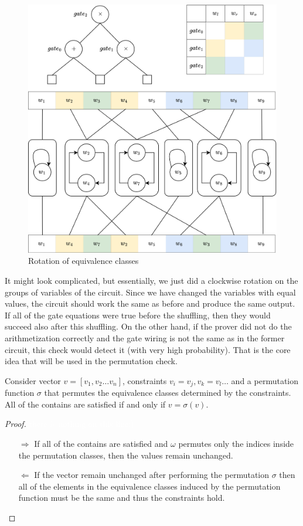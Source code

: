 \begin{figure}[H]
    \label{fig:permutation-function}
    \includegraphics[width=0.75\linewidth]{round-figures/round2/permutation_function.drawio.png}
    \caption{Rotation of equivalence classes}
\end{figure}

It might look complicated, but essentially, we just did a clockwise rotation on the groups of variables of the circuit. Since we have changed the variables with equal values, the circuit should work the same as before and produce the same output. If all of the gate equations were true before the shuffling, then they would succeed also after this shuffling. On the other hand, if the prover did not do the arithmetization correctly and the gate wiring is not the same as in the former circuit, this check would detect it (with very high probability). That is the core idea that will be used in the permutation check.

\begin{lemma}
    \label{permutation-correctness-soundness}
    Consider vector $v = [v_1, v_2 \ldots v_n]$, constraints $v_i = v_j, v_k = v_l \ldots$ and a permutation function $\sigma$ that permutes the equivalence classes determined by the constraints. All of the contains are satisfied if and only if $v = \sigma(v)$.
\end{lemma}

\begin{proof}
    \textcolor{white}{there is nothing on this line:)}
    
    \begin{enumerate}
        \item[$\Rightarrow$] If all of the contains are satisfied and $\omega$ permutes only the indices inside the permutation classes, then the values remain unchanged. 
        \item[$\Leftarrow$]  If the vector remain unchanged after performing the permutation $\sigma$ then all of the elements in the equivalence classes induced by the permutation function must be the same and thus the constraints hold.
    \end{enumerate}
\end{proof}

